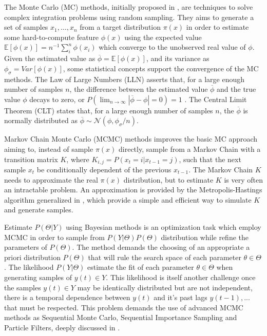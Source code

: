 The Monte Carlo (MC) methods, initially proposed in \cite{Metropolis1949}, are techniques to solve complex  integration problems using random sampling. They aims to generate a set of samples $x_1,\ldots,x_n$ from a target distribution $\pi(x)$ in order to estimate some hard-to-compute feature $\phi(x)$ using the expected value $\mathbb{E}[\phi(x)] = n^{-1}\sum_i^n \phi(x_i)$ which converge to the unobserved real value of $\phi$. Given the estimated value as $\overline{\phi} = \mathbb{E}[\phi(x)]$, and its variance as $\phi_\sigma = Var[\phi(x)]$, some statistical concepts support the convergence of the MC methods. The Law of Large Numbers (LLN) asserts that, for a large enough number of samples $n$, the difference between the estimated value $\overline{\phi}$ and the true value $\phi$ decays to zero, or $P(\lim_{n\to\infty} |\overline{\phi} - \phi| = 0) = 1$ . The Central Limit Theorem (CLT) states that, for a large enough number of samples $n$, the $\overline{\phi}$ is normally distributed as $\overline{\phi} \sim \mathcal{N}(\phi,\phi_\sigma/n)$.

Markov Chain Monte Carlo (MCMC) methods improves the basic MC approach aiming to, instead of sample $\pi(x)$ directly, sample from a Markov Chain with a transition matrix $K$, where $K_{i,j} = P(x_t = i|x_{t-1} = j)$, such that the next sample $x_t$ be conditionally dependent of the previous $x_{t-1}$. The Markov Chain $K$ needs to approximate the real $\pi(x)$ distribution, but to estimate $K$ is very often an intractable problem. An approximation is provided by the Metropolis-Hastings algorithm generalized in \cite{Hastings1970}, which provide a simple and efficient way to simulate $K$ and generate samples. 

Estimate $P(\Theta|Y)$ using Bayesian methods is an optimization task which employ MCMC in order to sample from $P(Y|\Theta)P(\Theta)$ distribution while refine the parameters of $P(\Theta)$. The method demands the choosing of an appropriate a priori distribution $P(\Theta)$ that will rule the search space of each parameter $\theta \in \Theta$. The likelihood $P(Y|\Theta)$ estimate the fit of each parameter $\theta \in \Theta$ when generating samples of $y(t)\in Y$. This likelihood is itself another challenge once the samples $y(t)\in Y$ may be identically distributed but are not independent, there is a temporal dependence between $y(t)$ and it's past lags $y(t-1),...$ that must be respected. This problem demands the use of advanced MCMC methods as Sequential Monte Carlo, Sequential Importance Sampling and Particle Filters, deeply discussed in \cite{Smith2013}.

